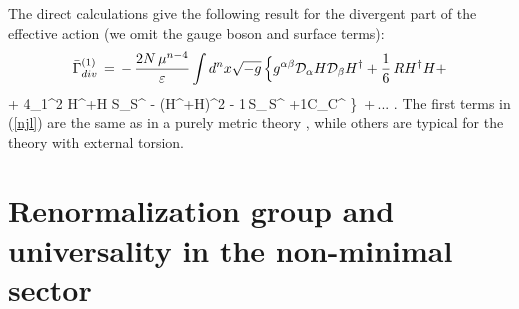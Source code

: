 The direct calculations give the
following result for the divergent part of the effective action (we omit
the gauge boson and surface terms):
$$
{\bar \Gamma}^{(1)}_{div} 
\,=\,-\, {2N\,\mu^{n-4} \over{\varepsilon}} \int d^nx \sqrt {-g}\, 
\Big\{
g^{\alpha\beta}{\cal{D}}_{\alpha}H {\cal{D}}_{\beta} H^\dagger +
{1\over6}\,R H^\dagger H +
$$
\beq
+ 4{\eta}_1^2 H^{+}H S_{\mu}S^{\mu} - (H^{+}H)^2 
- {1}\,S_{\mu\nu}\,S^{\mu\nu} 
+{1}C_{\mu\nu\alpha\beta}C^{\mu\nu\alpha\beta} \Big\}
\,+\,...\,\,.      
\label{njl}
\eeq
The first terms in (\ref{njl}) are the same as
in a purely metric theory \cite{hill&Salopek,mutodi},
while others are typical for the theory with external torsion. 


\section{Renormalization group and universality 
in the non-minimal sector}

